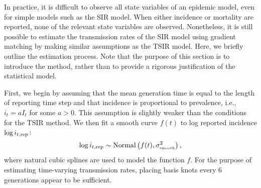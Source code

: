 \documentclass{article}
\newcommand{\tsub}[2]{#1_{{\textrm{\tiny #2}}}}
\begin{document}
In practice, it is difficult to observe all state variables of an epidemic model, even for simple models such as the SIR model.
When either incidence or mortality are reported, none of the relevant state variables are observed.
Nonetheless, it is still possible to estimate the transmission rates of the SIR model using gradient matching by making similar assumptions as the TSIR model.
Here, we briefly outline the estimation process.
Note that the purpose of this section is to introduce the method, rather than to provide a rigorous justification of the statistical model.

First, we begin by assuming that the mean generation time is equal to the length of reporting time step and that incidence is proportional to prevalence, i.e., $i_t = a I_t$ for some $a > 0$. 
This assumption is slightly weaker than the conditions for the TSIR method.
We then fit a smooth curve $f(t)$ to log reported incidence $\log i_{t, {\tiny \textrm{rep}}}$:
\begin{equation}
\log i_{t, {\tiny \textrm{rep}}} \sim \mathrm{Normal}\left(f(t), \tsub{\sigma}{smooth}^2 \right),
\end{equation}
where natural cubic splines are used to model the function $f$.
For the purpose of estimating time-varying transmission rates, placing basis knots every 6 generations appear to be sufficient.
\end{document}
